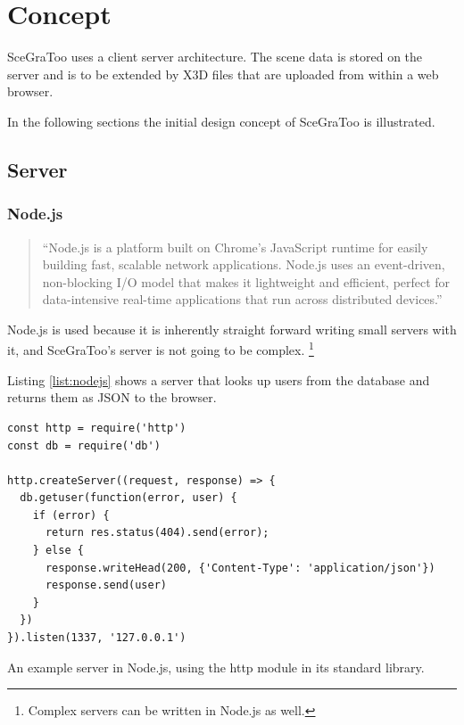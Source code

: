 
\section{Concept}
\label{concept}


\gls{SceGraToo} uses a client server architecture. The scene data is stored on the server
and is to be extended by \gls{X3D} files that are uploaded from within a web browser.

In the following sections the initial design concept of \gls{SceGraToo} is illustrated.

\subsection{Server}
\label{server}


\subsubsection{Node.js}
\begin{quote}
  ``Node.js is a platform built on Chrome's JavaScript runtime for easily building fast, scalable network applications. Node.js uses an event-driven, non-blocking I/O model that makes it lightweight and efficient, perfect for data-intensive real-time applications that run across distributed devices.'' \cite{nodejs}
\end{quote}

Node.js is used because it is inherently straight forward writing small servers with it, and
SceGraToo's server is not going to be complex. \footnote{Complex servers can be
written in Node.js as well.}

Listing \ref{list:nodejs} shows a server that looks up users from the database and returns them as \gls{JSON} to the browser.

\begin{listing}
  \begin{verbatim}
const http = require('http')
const db = require('db')

http.createServer((request, response) => {
  db.getuser(function(error, user) {
    if (error) {
      return res.status(404).send(error);
    } else {
      response.writeHead(200, {'Content-Type': 'application/json'})
      response.send(user)
    }
  })
}).listen(1337, '127.0.0.1')
  \end{verbatim}
  \caption{An example server in Node.js, using the http module in its standard library.}
  \label{list:nodejs}
\end{listing}

